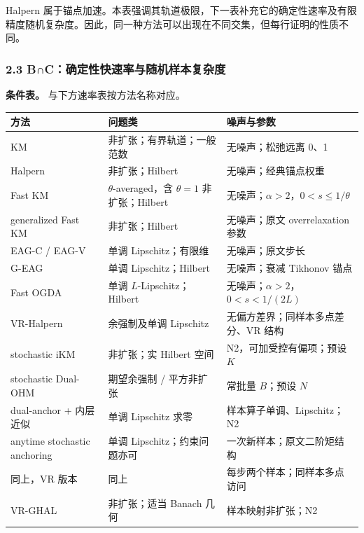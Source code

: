 \documentclass[
  chinese,
  10pt,
  a4paper,
]{article}
\newcounter{none} %
\begin{document}
Halpern
属于锚点加速。本表强调其轨道极限，下一表补充它的确定性速率及有限精度随机复杂度。因此，同一种方法可以出现在不同交集，但每行证明的性质不同。

\subsubsection{2.3
B∩C：确定性快速率与随机样本复杂度}\label{bcux786eux5b9aux6027ux5febux901fux7387ux4e0eux968fux673aux6837ux672cux590dux6742ux5ea6}

\textbf{条件表。} 与下方速率表按方法名称对应。

{\def\LTcaptype{none} %
\begin{longtable}[]{@{}
  >{\raggedright\arraybackslash}p{}
  >{\raggedright\arraybackslash}p{}
  >{\raggedright\arraybackslash}p{}@{}}
\toprule\noalign{}
\begin{minipage}[b]{\linewidth}\raggedright
方法
\end{minipage} & \begin{minipage}[b]{\linewidth}\raggedright
问题类
\end{minipage} & \begin{minipage}[b]{\linewidth}\raggedright
噪声与参数
\end{minipage} \\
\midrule\noalign{}
\endhead
\bottomrule\noalign{}
\endlastfoot
KM & 非扩张；有界轨道；一般范数 & 无噪声；松弛远离 0、1 \\
Halpern & 非扩张；Hilbert & 无噪声；经典锚点权重 \\
Fast KM & \(\theta\)-averaged，含 \(\theta=1\) 非扩张；Hilbert &
无噪声；\(\alpha>2\)，\(0<s\le1/\theta\) \\
generalized Fast KM & 非扩张；Hilbert & 无噪声；原文 overrelaxation
参数 \\
EAG-C / EAG-V & 单调 Lipschitz；有限维 & 无噪声；原文步长 \\
G-EAG & 单调 Lipschitz；Hilbert & 无噪声；衰减 Tikhonov 锚点 \\
Fast OGDA & 单调 \(L\)-Lipschitz；Hilbert &
无噪声；\(\alpha>2\)，\(0<s<1/(2L)\) \\
VR-Halpern & 余强制及单调 Lipschitz & 无偏方差界；同样本多点差分、VR
结构 \\
stochastic iKM & 非扩张；实 Hilbert 空间 & N2，可加受控有偏项；预设
\(K\) \\
stochastic Dual-OHM & 期望余强制 / 平方非扩张 & 常批量 \(B\)；预设
\(N\) \\
dual-anchor + 内层近似 & 单调 Lipschitz 求零 &
样本算子单调、Lipschitz；N2 \\
anytime stochastic anchoring & 单调 Lipschitz；约束问题亦可 &
一次新样本；原文二阶矩结构 \\
同上，VR 版本 & 同上 & 每步两个样本；同样本多点访问 \\
VR-GHAL & 非扩张；适当 Banach 几何 & 样本映射非扩张；N2 \\
\end{longtable}
}
\end{document}

